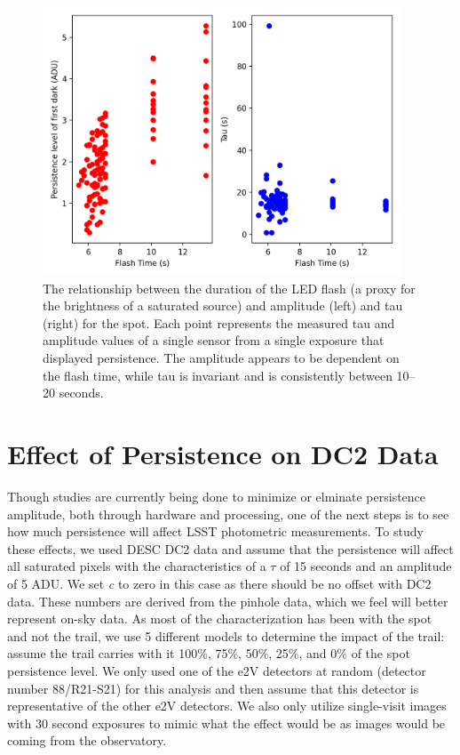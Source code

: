 \documentclass[DM,authoryear,toc]{lsstdoc}
\begin{document}
\begin{figure}[!ht]
  \centering
  \includegraphics[width=0.95\textwidth, angle=0]{Persistence_Flash_Tau.png}
  \caption{
  The relationship between the duration of the LED flash (a proxy for the brightness of a saturated source) and amplitude (left) and tau (right) for the spot.
  Each point represents the measured tau and amplitude values of a single sensor from a single exposure that displayed persistence.
  The amplitude appears to be dependent on the flash time, while tau is invariant and is consistently between 10--20 seconds. 
  }\label{fig:Pers_Flash_Tau}
\end{figure}

\section{Effect of Persistence on DC2 Data}

Though studies are currently being done to minimize or elminate persistence amplitude, both through hardware and processing, one of the next steps is to see how much persistence will affect LSST photometric measurements.
To study these effects, we used DESC DC2 data and assume that the persistence will affect all saturated pixels with the characteristics of a \textit{$\tau$} of 15 seconds and an amplitude of 5 ADU\@.
We set \textit{c} to zero in this case as there should be no offset with DC2 data.
These numbers are derived from the pinhole data, which we feel will better represent on-sky data.
As most of the characterization has been with the spot and not the trail, we use 5 different models to determine the impact of the trail: assume the trail carries with it 100\%, 75\%, 50\%, 25\%, and 0\% of the spot persistence level.
We only used one of the e2V detectors at random (detector number 88/R21-S21) for this analysis and then assume that this detector is representative of the other e2V detectors.
We also only utilize single-visit images with 30 second exposures to mimic what the effect would be as images would be coming from the observatory.
\end{document}

